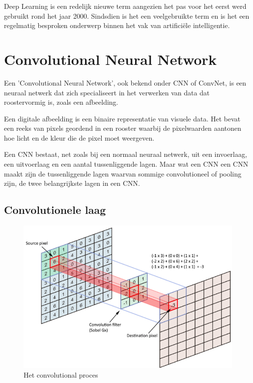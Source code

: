 Deep Learning is een redelijk nieuwe term aangezien het pas voor het eerst werd gebruikt rond het jaar 2000. Sindsdien is het een veelgebruikte term en is het een regelmatig besproken onderwerp binnen het vak van artificiële intelligentie. \autocite{Goff2018}


\section{Convolutional Neural Network}

Een 'Convolutional Neural Network', ook bekend onder CNN of ConvNet, is een neuraal netwerk dat zich specialiseert in het verwerken van data dat roostervormig is, zoals een afbeelding. 


Een digitale afbeelding is een binaire representatie van visuele data. Het bevat een reeks van pixels geordend in een rooster waarbij de pixelwaarden aantonen hoe licht en de kleur die de pixel moet weergeven.

Een CNN bestaat, net zoals bij een normaal neuraal netwerk, uit een invoerlaag, een uitvoerlaag en een aantal tussenliggende lagen.
Maar wat een CNN een CNN maakt zijn de tussenliggende lagen waarvan sommige convolutioneel of pooling zijn, de twee belangrijkste lagen in een CNN.

\subsection{Convolutionele laag}




\begin{figure}
	
	
	\includegraphics[width=\linewidth]{img/convolution.png}
	\caption{Het convolutional proces}
	\label{tab:convolutional}
\end{figure}

